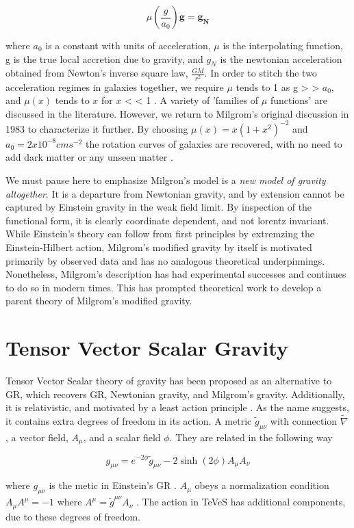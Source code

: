 \documentclass[12pt]{article}
\begin{document}
$$ \mu (\frac{g}{a_{0}}) \mathbf{g} =\mathbf{ g_{N}} $$

where $a_{0}$ is a constant with units of acceleration, $\mu$ is the interpolating function, g is the true local accretion due to gravity, and $g_{N}$ is the newtonian acceleration obtained from Newton's inverse square law, $\frac{GM}{r^2}$. In order to stitch the two acceleration regimes in galaxies together, we require $\mu$ tends to 1 as g > > $a_{0}$, and $\mu(x)$ tends to  $x$ for $x$ < < 1 \cite{Famaey2012}. A variety of 'families of $\mu$ functions' are discussed in the literature. However, we return to Milgrom's original discussion in 1983 to characterize it further. By choosing $\mu(x) = x(1+x^{2})^{-2}$ and $a_{0}= 2 x 10^{-8} cms^{-2}$ the rotation curves of galaxies are recovered, with no need to add dark matter or any unseen matter \cite{MilgromII1983}.

We must pause here to emphasize Milgron's model is a \emph{new model of gravity altogether}. It is a departure from Newtonian gravity, and by extension cannot be captured by Einstein gravity in the weak field limit. By inspection of the functional form, it is clearly coordinate dependent, and not lorentz invariant. While Einstein's theory can follow from first principles by extremzing the Einstein-Hilbert action, Milgrom's modified gravity by itself is motivated primarily by observed data and has no analogous theoretical underpinnings. Nonetheless, Milgrom's description has had experimental successes and continues to do so in modern times. This has prompted theoretical work to develop a parent theory of Milgrom's modified gravity.

\section{Tensor Vector Scalar Gravity}
Tensor Vector Scalar theory of gravity has been proposed as an alternative to GR, which recovers GR, Newtonian gravity, and Milgrom's gravity. Additionally, it is relativistic, and motivated by a least action principle \cite{Bekenstein2004}. As the name suggests, it contains extra degrees of freedom in its action. A metric $\tilde{g}_{\mu \nu}$ with connection $\tilde{\nabla}$, a vector field, $A_{\mu}$, and a scalar field $\phi$. They are related in the following way

$$ g_{\mu \nu} = e^{-2 \phi} \tilde{g}_{\mu \nu} - 2\sinh (2\phi) A_{\mu} A_{\nu}$$

where $ g_{\mu \nu}$ is the metic in Einstein's GR \cite{Bekenstein2006}. $A_{\mu}$ obeys a normalization condition $A_{\mu} A^{\mu} = -1$ where $ A^{\mu} = \tilde{g}^{\mu \nu} A_{\nu}$ \cite{masud2014}. The action in TeVeS has additional components, due to these degrees of freedom.
\end{document}
